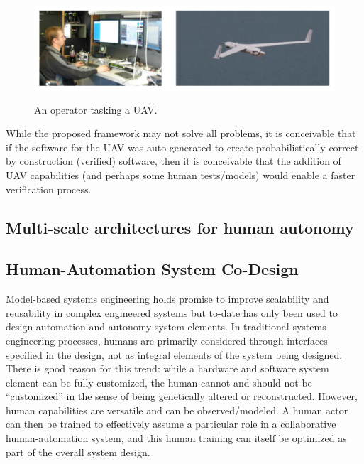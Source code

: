 \begin{figure}[h] %
   \centering
   \includegraphics[height=1.5in]{uav-operator.pdf} 
   \caption{An operator tasking a UAV. }
   \label{fig:uav-operator}
\end{figure}


While the proposed framework may not solve all problems, it is conceivable that if the software for the UAV was auto-generated to create probabilistically correct by construction (verified) software, then it is conceivable that the addition of UAV capabilities (and perhaps some human tests/models) would enable a faster verification process. 



\subsection*{Multi-scale architectures for human autonomy}


\subsection*{Human-Automation System Co-Design}

Model-based systems engineering holds promise to improve scalability and reusability in complex 
engineered systems but to-date has only been used to design automation and autonomy system elements.
In traditional systems engineering processes, humans are primarily considered through interfaces 
specified in the design, not as integral elements of the system being designed.  
There is good reason 
for this trend:  while a hardware and software system element can be fully customized, the human 
cannot and should not be ``customized'' in the sense of being genetically altered or reconstructed.
However, human capabilities are versatile and can be observed/modeled.  A human actor can then 
be trained to effectively assume a particular role in a collaborative human-automation system, 
and this human training can itself be optimized as part of the overall system design.

